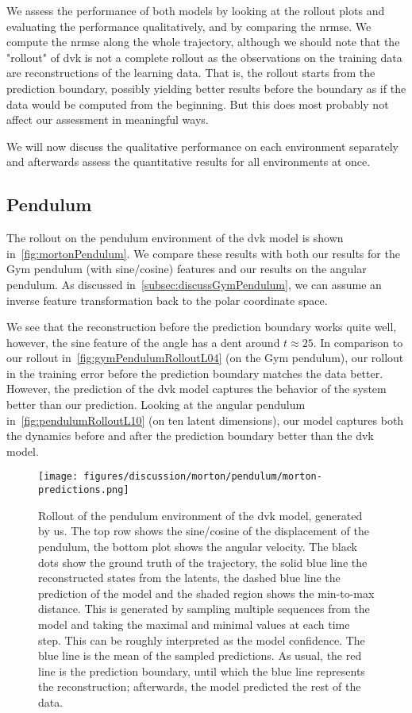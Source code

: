 	We assess the performance of both models by looking at the rollout plots and evaluating the performance qualitatively, and by comparing the \acrlong{nrmse}. We compute the \ac{nrmse} along the whole trajectory, although we should note that the "rollout" of \ac{dvk} is not a complete rollout as the observations on the training data are reconstructions of the learning data. That is, the rollout starts from the prediction boundary, possibly yielding better results before the boundary as if the data would be computed from the beginning. But this does most probably not affect our assessment in meaningful ways.

	We will now discuss the qualitative performance on each environment separately and afterwards assess the quantitative results for all environments at once.

	\subsection{Pendulum}
		The rollout on the pendulum environment of the \ac{dvk} model is shown in~\autoref{fig:mortonPendulum}. We compare these results with both our results for the Gym pendulum (with sine/cosine) features and our results on the angular pendulum. As discussed in~\autoref{subsec:discussGymPendulum}, we can assume an inverse feature transformation back to the polar coordinate space.

		We see that the reconstruction before the prediction boundary works quite well, however, the sine feature of the angle has a dent around \( t \approx 25 \). In comparison to our rollout in~\autoref{fig:gymPendulumRolloutL04} (on the Gym pendulum), our rollout in the training error before the prediction boundary matches the data better. However, the prediction of the \ac{dvk} model captures the behavior of the system better than our prediction. Looking at the angular pendulum in~\autoref{fig:pendulumRolloutL10} (on ten latent dimensions), our model captures both the dynamics before and after the prediction boundary better than the \ac{dvk} model.

		\begin{figure}
			\centering
			\texttt{[image: figures/discussion/morton/pendulum/morton-predictions.png]}
			\caption[Rollout of the pendulum environment of the DVK model]{Rollout of the pendulum environment of the \ac{dvk} model, generated by us. The top row shows the sine/cosine of the displacement of the pendulum, the bottom plot shows the angular velocity. The black dots show the ground truth of the trajectory, the solid blue line the reconstructed states from the latents, the dashed blue line the prediction of the model and the shaded region shows the min-to-max distance. This is generated by sampling multiple sequences from the model and taking the maximal and minimal values at each time step. This can be roughly interpreted as the model confidence. The blue line is the mean of the sampled predictions. As usual, the red line is the prediction boundary, until which the blue line represents the reconstruction; afterwards, the model predicted the rest of the data.}
			\label{fig:mortonPendulum}
		\end{figure}

